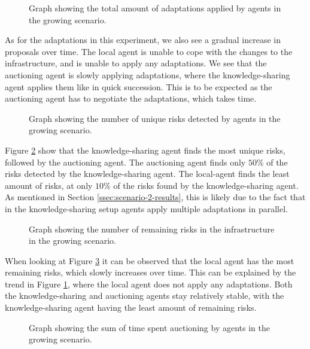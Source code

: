 \begin{figure}[H]
    \centering
    
    \caption{Graph showing the total amount of adaptations applied by agents in the growing scenario.}
    \label{fig:proposals-growing}
\end{figure}

As for the adaptations in this experiment, we also see a gradual increase in proposals over time. The local agent is unable to cope with the changes to the infrastructure, and is unable to apply any adaptations. We see that the auctioning agent is slowly applying adaptations, where the knowledge-sharing agent applies them like in quick succession. This is to be expected as the auctioning agent has to negotiate the adaptations, which takes time.

\begin{figure}[H]
    \centering
        
    \caption{Graph showing the number of unique risks detected by agents in the growing scenario.}
    \label{fig:risk-count-growing}
\end{figure}

Figure \ref{fig:risk-count-growing} show that the knowledge-sharing agent finds the most unique risks, followed by the auctioning agent. The auctioning agent finds only $50\%$ of the risks detected by the knowledge-sharing agent. The local-agent finds the least amount of risks, at only $10\%$ of the risks found by the knowledge-sharing agent. As mentioned in Section \ref{ssec:scenario-2-results}, this is likely due to the fact that in the knowledge-sharing setup agents apply multiple adaptations in parallel. 

\begin{figure}[H]
    \centering
        
    \caption{Graph showing the number of remaining risks in the infrastructure in the growing scenario.}
    \label{fig:risk-remaining-growing}
\end{figure}

When looking at Figure \ref{fig:risk-remaining-growing} it can be observed that the local agent has the most remaining risks, which slowly increases over time. This can be explained by the trend in Figure \ref{fig:proposals-growing}, where the local agent does not apply any adaptations. Both the knowledge-sharing and auctioning agents stay relatively stable, with the knowledge-sharing agent having the least amount of remaining risks. 

\begin{figure}[H]
    \hspace*{-1.2cm}
    \centering
        
    \caption{Graph showing the sum of time spent auctioning by agents in the growing scenario.}
    \label{fig:auctioning-time-growing}
\end{figure}

